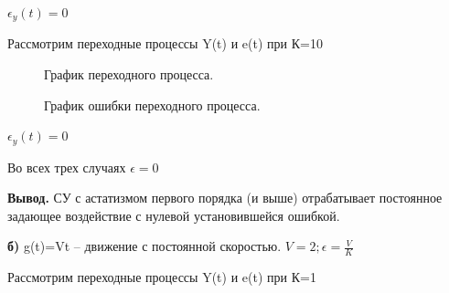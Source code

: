 \documentclass[a4paper, 11pt]{article}
\begin{document}
\normalsize{$\epsilon_y(t)=0$

Рассмотрим переходные процессы Y(t) и e(t) при К=10}

\begin{figure}[h]
    \caption{График переходного процесса.}
    \label{two}
\end{figure}

\newpage

\begin{figure}[h]
    \caption{График ошибки переходного процесса.}
    \label{tree}
\end{figure}

\normalsize{$\epsilon_y(t)=0$

Во всех трех случаях $\epsilon = 0$

\textbf{Вывод.} СУ с астатизмом первого порядка (и выше) отрабатывает постоянное задающее воздействие с нулевой установившейся ошибкой.}

\hfill \break
\normalsize{\textbf{б)} g(t)=Vt – движение с постоянной скоростью.  $V = 2; \epsilon=\frac{V}{K}$}

\normalsize{Рассмотрим переходные процессы Y(t) и e(t) при К=1}
\end{document}
